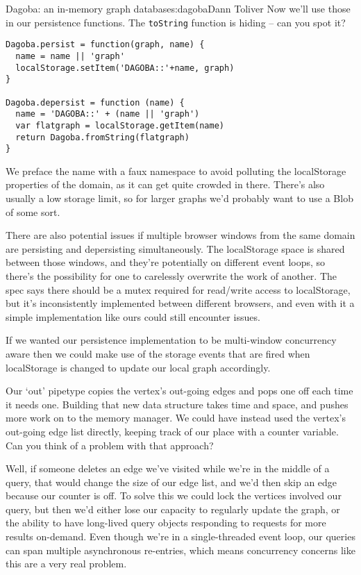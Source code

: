 \begin{aosachapter}{Dagoba: an in-memory graph database}{s:dagoba}{Dann Toliver}
Now we'll use those in our persistence functions. The \texttt{toString}
function is hiding -- can you spot it?

\begin{verbatim}
Dagoba.persist = function(graph, name) {
  name = name || 'graph'
  localStorage.setItem('DAGOBA::'+name, graph)
}

Dagoba.depersist = function (name) {
  name = 'DAGOBA::' + (name || 'graph')
  var flatgraph = localStorage.getItem(name)
  return Dagoba.fromString(flatgraph)
}
\end{verbatim}

We preface the name with a faux namespace to avoid polluting the
localStorage properties of the domain, as it can get quite crowded in
there. There's also usually a low storage limit, so for larger graphs
we'd probably want to use a Blob of some sort.

There are also potential issues if multiple browser windows from the
same domain are persisting and depersisting simultaneously. The
localStorage space is shared between those windows, and they're
potentially on different event loops, so there's the possibility for one
to carelessly overwrite the work of another. The spec says there should
be a mutex required for read/write access to localStorage, but it's
inconsistently implemented between different browsers, and even with it
a simple implementation like ours could still encounter issues.

If we wanted our persistence implementation to be multi-window
concurrency aware then we could make use of the storage events that are
fired when localStorage is changed to update our local graph
accordingly.

\label{updates}

Our `out' pipetype copies the vertex's out-going edges and pops one off
each time it needs one. Building that new data structure takes time and
space, and pushes more work on to the memory manager. We could have
instead used the vertex's out-going edge list directly, keeping track of
our place with a counter variable. Can you think of a problem with that
approach?

Well, if someone deletes an edge we've visited while we're in the middle
of a query, that would change the size of our edge list, and we'd then
skip an edge because our counter is off. To solve this we could lock the
vertices involved our query, but then we'd either lose our capacity to
regularly update the graph, or the ability to have long-lived query
objects responding to requests for more results on-demand. Even though
we're in a single-threaded event loop, our queries can span multiple
asynchronous re-entries, which means concurrency concerns like this are
a very real problem.


\end{aosachapter}
